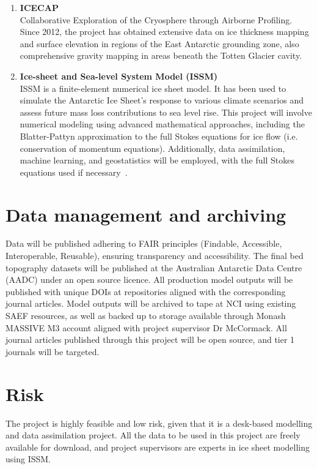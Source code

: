 \begin{enumerate}
    \item\textbf{ICECAP}\\ 
    Collaborative Exploration of the Cryosphere through Airborne Profiling. Since 2012, the project has obtained extensive data on ice thickness mapping and surface elevation in regions of the East Antarctic grounding zone, also comprehensive gravity mapping in areas beneath the Totten Glacier cavity\cite{ICECAP}.

    \item\textbf{Ice-sheet and Sea-level System Model (ISSM)}\\
    ISSM is a finite-element numerical ice sheet model. It has been used to simulate the Antarctic Ice Sheet’s response to various climate scenarios and assess future mass loss contributions to sea level rise\cite{deRydt_2013, Morlighem_2020}. This project will involve numerical modeling using advanced mathematical approaches, including the Blatter-Pattyn approximation to the full Stokes equations for ice flow (i.e. conservation of momentum equations). Additionally, data assimilation, machine learning, and geostatistics will be employed, with the full Stokes equations used if necessary~\cite{ISSM}.
\end{enumerate}

\section*{Data management and archiving}

Data will be published adhering to FAIR principles (Findable, Accessible, Interoperable, Reusable), ensuring transparency and accessibility. The final bed topography datasets will be published at the Australian Antarctic Data Centre (AADC) under an open source licence. All production model outputs will be published with unique DOIs at repositories aligned with the corresponding journal articles. Model outputs will be archived to tape at NCI using existing SAEF resources, as well as backed up to storage available through Monash MASSIVE M3 account aligned with project supervisor Dr McCormack. All journal articles published through this project will be open source, and tier 1 journals will be targeted.

\section*{Risk}

The project is highly feasible and low risk, given that it is a desk-based modelling and data assimilation project. All the data to be used in this project are freely available for download, and project supervisors are experts in ice sheet modelling using ISSM. 

